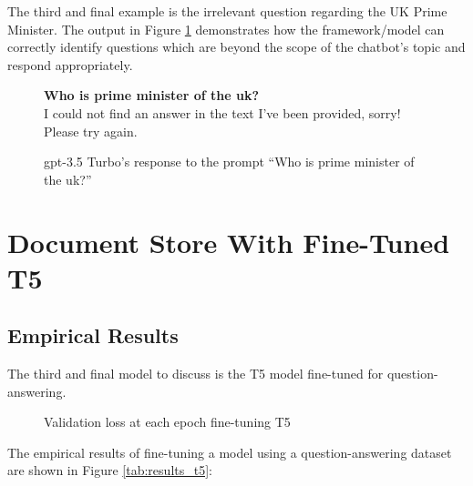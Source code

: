 The third and final example is the irrelevant question regarding the UK Prime Minister. The output in Figure \ref{fig:results_gpt_ex3} demonstrates how the framework/model can correctly identify questions which are beyond the scope of the chatbot's topic and respond appropriately.

\begin{figure}[h]
    \begin{itquote}
        \textbf{Who is prime minister of the uk?} \\
        I could not find an answer in the text I've been provided, sorry! Please try again.
    \end{itquote}
    \caption{\acrshort{gpt}-3.5 Turbo's response to the prompt ``Who is prime minister of the uk?''}
    \label{fig:results_gpt_ex3}
\end{figure}

\section{Document Store With Fine-Tuned T5}\label{sec:results_t5}
\subsection{Empirical Results}
The third and final model to discuss is the T5 model fine-tuned for question-answering.

\begin{figure}[h]
\centering
\caption{Validation loss at each epoch fine-tuning T5}
\label{fig:results_t5_val_loss}
\end{figure}

The empirical results of fine-tuning a model using a question-answering dataset are shown in Figure \ref{tab:results_t5}:

